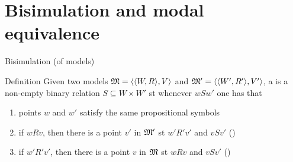 \documentclass{beamer}
\begin{document}
\section{Bisimulation and modal equivalence}
\begin{slide}{Bisimulation (of models)}\label{s:29}
\small
\begin{block}{Definition}
Given two models $\mathfrak{M} = \mathopen{\langle}\mathopen{\langle}W, R\mathclose{\rangle}, V\mathclose{\rangle}$ and $\mathfrak{M}' = \mathopen{\langle}\mathopen{\langle}W', R'\mathclose{\rangle}, V'\mathclose{\rangle}$, a  is a non-empty binary relation
$S \subseteq W \times W'$  st whenever $w S w'$ one has that
\begin{enumerate}
\item points $w$ and $w'$ satisfy the same propositional symbols
\item if $w R v$, then there is a point $v'$ in $\mathfrak{M}'$ st  $w' R' v'$ and $v S v'$ \hspace{0.3cm} ()
\item if $w' R' v'$, then there is a point $v$ in $\mathfrak{M}$ st  $w R v$ and $v S v'$ \hspace{0.3cm} ()
\end{enumerate}
\end{block}
\end{slide}

\end{document}

